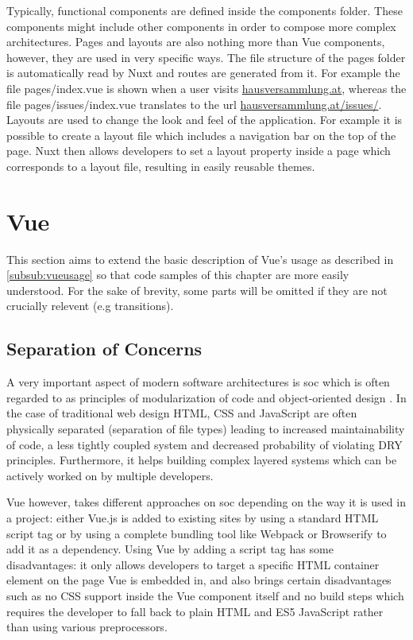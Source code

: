 Typically, functional components are defined inside the components folder. These components might include other components in order to compose more complex architectures. Pages and layouts are also nothing more than Vue components, however, they are used in very specific ways. The file structure of the pages folder is automatically read by Nuxt and routes are generated from it. For example the file pages/index.vue is shown when a user visits \url{hausversammlung.at}, whereas the file pages/issues/index.vue translates to the url \url{hausversammlung.at/issues/}. Layouts are used to change the look and feel of the application. For example it is possible to create a layout file which includes a navigation bar on the top of the page. Nuxt then allows developers to set a layout property inside a page which corresponds to a layout file, resulting in easily reusable themes. 

\section{Vue}
This section aims to extend the basic description of Vue's usage as described in \autoref{subsub:vueusage} so that code samples of this chapter are more easily understood. For the sake of brevity, some parts will be omitted if they are not crucially relevent (e.g transitions). 

\subsection{Separation of Concerns}
A very important aspect of modern software architectures is \acrfull{soc} which is often regarded to as principles of modularization of code and object-oriented design \cite{laplante2007every:book}. In the case of traditional web design HTML, CSS and JavaScript are often physically separated (separation of file types) leading to increased maintainability of code, a less tightly coupled system and decreased probability of violating DRY principles. Furthermore, it helps building complex layered systems which can be actively worked on by multiple developers. 

Vue however, takes different approaches on \acrshort{soc} depending on the way it is used in a project:
either Vue.js is added to existing sites by using a standard HTML script tag or by using a complete bundling tool like Webpack or Browserify to add it as a dependency. Using Vue by adding a script tag has some disadvantages: it only allows developers to target a specific HTML container element on the page Vue is embedded in, and also brings certain disadvantages such as no CSS support inside the Vue component itself and no build steps which requires the developer to fall back to plain HTML and ES5 JavaScript rather than using various preprocessors. \newline

